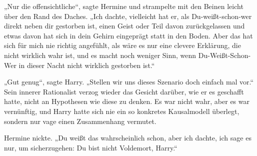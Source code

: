 „Nur die offensichtliche“, sagte Hermine und strampelte mit den Beinen leicht über den Rand des Daches. „Ich dachte, vielleicht hat er, als Du-weißt-schon-wer direkt neben dir gestorben ist, einen Geist oder Teil davon zurückgelassen und etwas davon hat sich in dein Gehirn eingeprägt statt in den Boden. Aber das hat sich für mich nie richtig angefühlt, als wäre es nur eine clevere Erklärung, die nicht wirklich wahr ist, und es macht noch weniger Sinn, wenn Du-Weißt-Schon-Wer in dieser Nacht nicht wirklich gestorben ist.“

„Gut genug“, sagte Harry. „Stellen wir uns dieses Szenario doch einfach mal vor.“
Sein innerer Rationalist verzog wieder das Gesicht darüber, wie er es geschafft hatte, nicht an Hypothesen wie diese zu denken. Es war nicht wahr, aber es war vernünftig, und Harry hatte sich nie ein so konkretes Kausalmodell überlegt, sondern nur vage einen Zusammenhang vermutet.

Hermine nickte.
„Du weißt das wahrscheinlich schon, aber ich dachte, ich sage es nur, um sicherzugehen: Du bist nicht Voldemort, Harry.“

